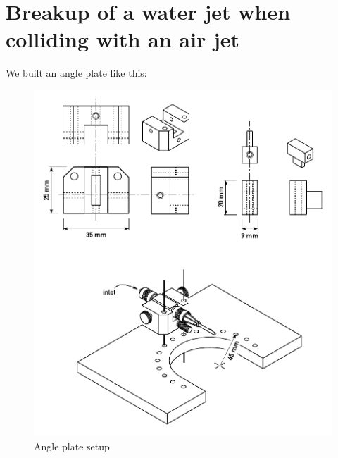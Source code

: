 \documentclass[11.5pt]{book}
\begin{document}
\chapter{Breakup of a water jet when colliding with an air jet}
We built an angle plate like this:
\begin{figure}
    \centering
    \includegraphics[width=\textwidth]{img/setup/angleplate.pdf}
    \caption{Angle plate setup}
    \label{fig:angle-plate}
\end{figure}


\end{document}
